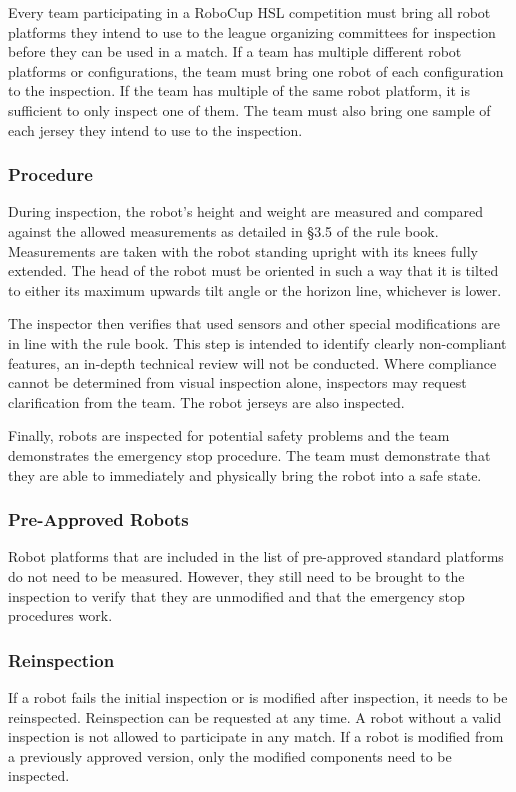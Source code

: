 Every team participating in a RoboCup HSL competition must bring all robot platforms they intend to use to the league organizing committees for inspection before they can be used in a match. If a team has multiple different robot platforms or configurations, the team must bring one robot of each configuration to the inspection. If the team has multiple of the same robot platform, it is sufficient to only inspect one of them. The team must also bring one sample of each jersey they intend to use to the inspection.

\subsubsection{Procedure}
During inspection, the robot's height and weight are measured and compared against the allowed measurements as detailed in §3.5 of the rule book. Measurements are taken with the robot standing upright with its knees fully extended. The head of the robot must be oriented in such a way that it is tilted to either its maximum upwards tilt angle or the horizon line, whichever is lower. 

The inspector then verifies that used sensors and other special modifications are in line with the rule book. This step is intended to identify clearly non-compliant features, an in-depth technical review will not be conducted. Where compliance cannot be determined from visual inspection alone, inspectors may request clarification from the team. The robot jerseys are also inspected.

Finally, robots are inspected for potential safety problems and the team demonstrates the emergency stop procedure. The team must demonstrate that they are able to immediately and physically bring the robot into a safe state.

\subsubsection{Pre-Approved Robots}
Robot platforms that are included in the list of pre-approved standard platforms do not need to be measured. However, they still need to be brought to the inspection to verify that they are unmodified and that the emergency stop procedures work.

\subsubsection{Reinspection}
If a robot fails the initial inspection or is modified after inspection, it needs to be reinspected. Reinspection can be requested at any time. A robot without a valid inspection is not allowed to participate in any match. If a robot is modified from a previously approved version, only the modified components need to be inspected.

